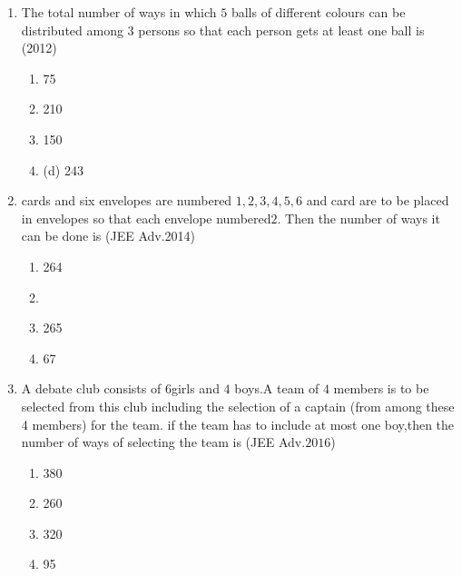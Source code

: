 \documentclass[journal,12pt,twocolumn]{IEEEtran}
\theoremstyle{remark}
\begin{document}
\begin{enumerate}[start=3]
\hfill{($2009$)}\\
\begin{multicols}{2} 
\begin{enumerate}
\item 55\item 77\columnbreak\item  66\item 88
\end{enumerate}
\end{multicols}
\item The total number of ways in which $5$ balls of different colours can be distributed among $3$ persons so that each person gets at least one ball is
\hfill{(2012)}\\
\begin{multicols}{2} 
\begin{enumerate}
\item  75\item 210\columnbreak\item150\item (d) 243
\end{enumerate}
\end{multicols}
\item cards and six envelopes are numbered $1,2,3,4,5,6$ and card are to be placed in envelopes so that each envelope numbered$2$. Then the number of ways it can be done is
\hspace*{\fill}(JEE Adv.2014)\\
\begin{multicols}{2} 
\begin{enumerate}
\item  264\item {}\item 265\item  67
\end{enumerate}
\end{multicols}
\item A debate club consists of $6 $girls and $4$ boys.A team of $4$ members is to be selected from this club including the selection of a captain (from among these 4 members) for the team. if the team has to include at most one boy,then the number of ways of selecting the team is
\hfill{(JEE Adv.$2016$)}\\
\begin{multicols}{2} 
\begin{enumerate}
\item  380\item 260\columnbreak\item 320\item  95
\end{enumerate}
\end{multicols}

\end{enumerate}
\end{document}
